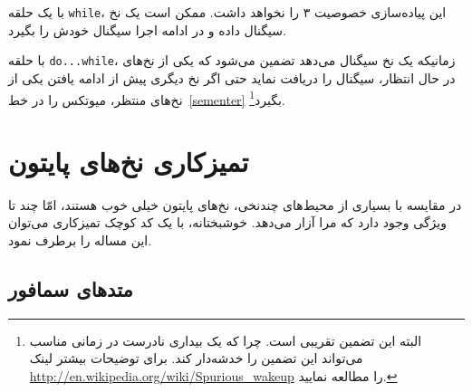 \documentclass{book}
\begin{document}
    با یک حلقه {\tt while}، این پیاده‌سازی خصوصیت ۳ را نخواهد داشت. ممکن است یک نخ سیگنال داده و در ادامه اجرا سیگنال خودش 
    را بگیرد. 

    با حلقه {\tt do...while}، زمانیکه یک نخ سیگنال می‌دهد تضمین می‌شود که یکی از نخ‌های در حال انتظار، سیگنال را دریافت نماید 
    حتی اگر نخ دیگری  پیش از ادامه یافتن یکی از نخ‌های منتظر، میوتکس را در خط~\ref{sementer} بگیرد\footnote{
    البته این تضمین تقریبی است. چرا که یک بیداری نادرست در زمانی مناسب می‌تواند این تضمین را خدشه‌دار کند. برای توضیحات بیشتر لینک 
    \url{http://en.wikipedia.org/wiki/Spurious_wakeup} را مطالعه نمایید. 
    }.



\setLTRbibitems



\appendix

\chapter{تمیزکاری نخ‌های پایتون}
\label{cleanup}

    در مقایسه با  بسیاری از محیط‌های چندنخی، نخ‌های پایتون خیلی خوب هستند، امّا چند تا ویژگی وجود دارد که مرا آزار می‌دهد. 
    خوشبختانه،‌ با یک کد کوچک تمیزکاری می‌توان این مساله را برطرف نمود. 

\section{متدهای سمافور}
\end{document}
